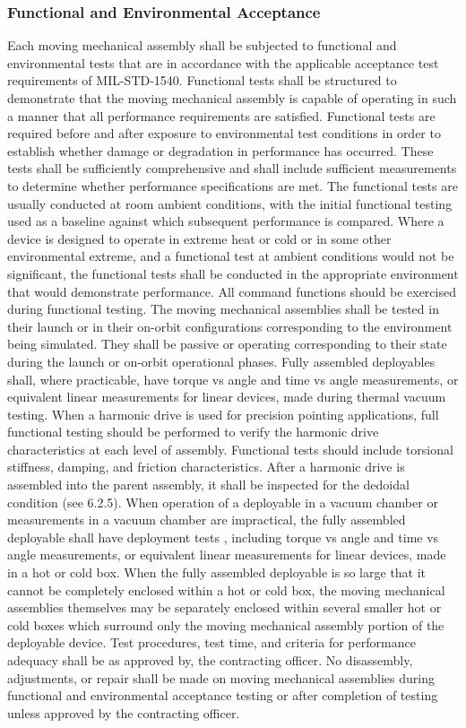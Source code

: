 \documentclass[12pt]{article}
\begin{document}
\subsubsection{Functional and Environmental Acceptance} %
Each moving mechanical assembly shall be subjected to functional and environmental tests that are in accordance with the applicable acceptance test requirements of MIL-STD-1540. 
Functional tests shall be structured to demonstrate that the moving mechanical assembly is capable of operating in such a manner that all performance requirements are satisfied. 
Functional tests are required before and after exposure to environmental test conditions in order to establish whether damage or degradation in performance has occurred. 
These tests shall be sufficiently comprehensive and shall include sufficient measurements to determine whether performance specifications are met. 
The functional tests are usually conducted at room ambient conditions, with the initial functional testing used as a baseline against which subsequent performance is compared. 
Where a device is designed to operate in extreme heat or cold or in some other environmental extreme, and a functional test at ambient conditions would not be significant, the functional tests shall be conducted in the appropriate environment that would demonstrate performance. 
All command functions should be exercised during functional testing. 
The moving mechanical assemblies shall be tested in their launch or in their on-orbit configurations corresponding to the environment being simulated. 
They shall be passive or operating corresponding to their state during the launch or on-orbit operational phases.
Fully assembled deployables shall, where practicable, have torque vs angle and time vs angle measurements, or equivalent linear measurements for linear devices, made during thermal vacuum testing. 
When a harmonic drive is used for precision pointing applications, full functional testing should be performed to verify the harmonic drive characteristics at each level of assembly. 
Functional tests should include torsional stiffness, damping, and friction characteristics. 
After a harmonic drive is assembled into the parent assembly, it shall be inspected for the dedoidal condition (see 6.2.5). 
When operation of a deployable in a vacuum chamber or measurements in a vacuum chamber are impractical, the fully assembled deployable shall have deployment tests , including torque vs angle and time vs angle measurements, or equivalent linear measurements for linear devices, made in a hot or cold box. 
When the fully assembled deployable is so large that it cannot be completely enclosed within a hot or cold box, the moving mechanical assemblies themselves may be separately enclosed within several smaller hot or cold boxes which surround only the moving mechanical assembly portion of the deployable device. 
Test procedures, test time, and criteria for performance adequacy shall be as approved by, the contracting officer. 
No disassembly, adjustments, or repair shall be made on moving mechanical assemblies during functional and environmental acceptance testing or after completion of testing unless approved by the contracting officer.
\end{document}
